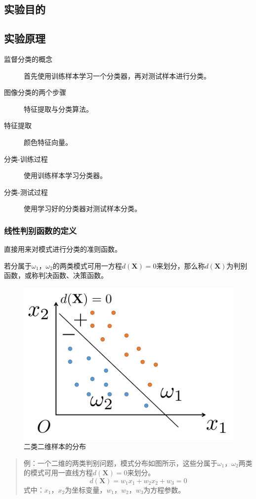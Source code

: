 \subsection{实验目的}
\subsection{实验原理}
\begin{description}
	\item[监督分类的概念] 首先使用训练样本学习一个分类器，再对测试样本进行分类。
	\item[图像分类的两个步骤] 特征提取与分类算法。
	\item[特征提取] 颜色特征向量。
	\item[分类-训练过程] 使用训练样本学习分类器。
	\item[分类-测试过程] 使用学习好的分类器对测试样本分类。
\end{description}
\subsubsection{线性判别函数的定义}
直接用来对模式进行分类的准则函数。

若分属于$\omega_1$，$\omega_2$的两类模式可用一方程$d(\mathbf{X})=0$来划分，那么称$d(\mathbf{X})$为判别函数，或称判决函数、决策函数。
\begin{figure}[H]
	\centering
	\includegraphics[width=0.7\linewidth]{figure/exp5classification}
	\caption{二类二维样本的分布}
	\label{fig:exp5classification}
\end{figure}
\begin{quote}
	\kaishu 例：一个二维的两类判别问题，模式分布如图所示，这些分属于$\omega_1$，$\omega_2$两类的模式可用一直线方程$d(\mathbf{X})=0$来划分。
	\[ d(\mathbf{X})=w_1x_1+w_2x_2+w_3=0 \]
	式中：$x_1$，$x_2$为坐标变量，$w_1$，$w_2$，$w_3$为方程参数。
\end{quote}
